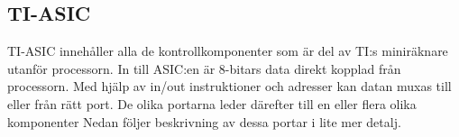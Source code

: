 \documentclass[main.tex]{subfiles}
\begin{document}
\subsection{TI-ASIC}
TI-ASIC innehåller alla de kontrollkomponenter som är del av TI:s miniräknare
utanför processorn. In till ASIC:en är 8-bitars data direkt kopplad från
processorn. Med hjälp av in/out instruktioner och adresser kan datan muxas
till eller från rätt port. De olika portarna leder därefter till en eller flera
olika komponenter Nedan följer beskrivning av dessa portar i lite mer detalj.







\end{document}
